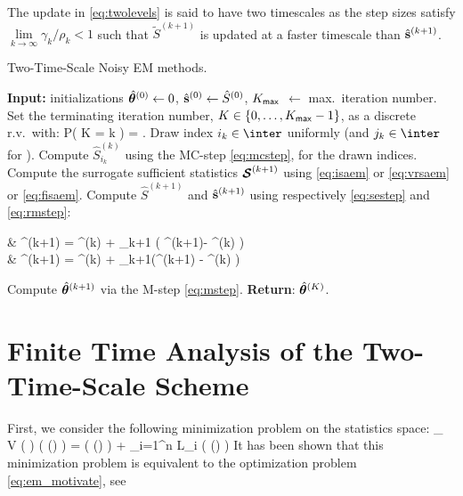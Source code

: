 \documentclass[11pt]{article}
\makeatletter
\theoremstyle{t}
\DeclareRobustCommand*\cal{\@fontswitch\relax\mathcal}
\makeatother
\begin{document}
The update in \eqref{eq:twolevels} is said to have two timescales as the step sizes satisfy $\lim \limits_{k \to \infty} \gamma_k/\rho_k < 1$ such that $ \tilde{S}^{(k+1)} $  is updated at a faster timescale than $\hat{{\mathbf{s}}}^{(k+1)}$.

\begin{algorithm}[H]
\caption{Two-Time-Scale Noisy EM methods.}\label{alg:ttsem}
  \begin{algorithmic}[1]
  \STATE \textbf{Input:} initializations $\hat{{\bm{\theta}}}^{(0)} \leftarrow 0$, $\hat{{\mathbf{s}}}^{(0)} \leftarrow \hat{S}^{(0)}$, $K_{\sf max}$ $\leftarrow$ max.~iteration number. \STATE Set the terminating iteration number, $K \in \{0,\dots,K_{\sf max}-1\}$, as a discrete r.v.~with:\vspace{-.1cm}
  \beq \label{eq:random}
   P( K = k ) = .\vspace{-.2cm}
  \eeq
  \STATE Draw index $i_k \in \inter$ uniformly (and $j_k \in \inter$ for \FISAEM).
     \STATE Compute $\hat{S}_{i_k}^{(k)}$ using the {\sf MC-step} \eqref{eq:mcstep},  for the drawn indices.
   \STATE Compute the surrogate sufficient statistics ${\bm{\mathcal{S}}}^{(k+1)}$ using \eqref{eq:isaem} or \eqref{eq:vrsaem} or \eqref{eq:fisaem}.
   \STATE Compute $\hat{S}^{(k+1)}$ and $\hat{{\mathbf{s}}}^{(k+1)}$ using respectively \eqref{eq:sestep} and \eqref{eq:rmstep}:
\beq \label{eq:twolevels}
\begin{split}
& ^{(k+1)} = ^{(k)} + \rho_{k+1} \big( \StocEstep^{(k+1)}- ^{(k)}  \big)\\
&  \hat{\bss}^{(k+1)} =  \hat{\bss}^{(k)}  + \gamma_{k+1}(^{(k+1)} - \hat{\bss}^{(k)} )
\end{split}
\eeq
   \STATE Compute $\hat{{\bm{\theta}}}^{(k+1)}$ via the {\sf M-step} \eqref{eq:mstep}.
\ENDFOR
\STATE \textbf{Return}: $\hat{{\bm{\theta}}}^{(K)}$.
  \end{algorithmic}
\end{algorithm}



\section{Finite Time Analysis of the Two-Time-Scale Scheme} \label{sec:mainanalysis}
First, we consider the following minimization problem on the statistics space:
\beq\label{eq:em_sspace}
\min_{ {\bss} \in \Sset }~  V ( {\bss} ) \eqdef \overline\calL( \op(\bss) ) = \Pen (  \op(\bss) ) +  \sum_{i=1}^n {\cal L}_i (  \op(\bss) )
\eeq
It has been shown that this minimization problem is equivalent to the optimization problem \eqref{eq:em_motivate}, see \citep[Lemma2]{karimi2019global}
\end{document}
